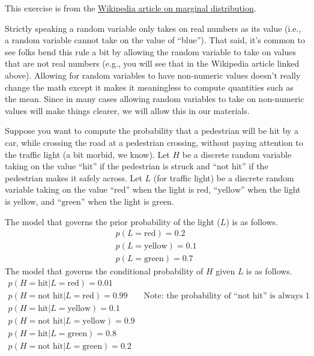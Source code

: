 \documentclass[assignment02_Solutions]{subfiles}
\begin{document}
\begin{exercise}[(15 minutes)]
This exercise is from the \href{https://en.wikipedia.org/wiki/Marginal_distribution\#Real-world_example}{Wikipedia article on marginal distribution}.

\vspace{1em}

\begin{notice}
Strictly speaking a random variable only takes on real numbers as its value (i.e., a random variable cannot take on the value of ``blue'').  That said, it's common to see folks bend this rule a bit by allowing the random variable to take on values that are not real numbers (e.g., you will see that in the Wikipedia article linked above).  Allowing for random variables to have non-numeric values doesn't really change the math except it makes it meaningless to compute quantities such as the mean.  Since in many cases allowing random variables to take on non-numeric values will make things clearer, we will allow this in our materials.
\end{notice} 
\vspace{1em}

Suppose you want to compute the probability that a pedestrian will be hit by a car, while crossing the road at a pedestrian crossing, without paying attention to the traffic light (a bit morbid, we know).  Let $H$ be a discrete random variable taking on the value ``$\mbox{hit}$'' if the pedestrian is struck and ``$\mbox{not hit}$'' if the pedestrian makes it safely across.  Let $L$ (for traffic light) be a discrete random variable taking on the value ``$\mbox{red}$'' when the light is red, ``$\mbox{yellow}$'' when the light is yellow, and ``$\mbox{green}$'' when the light is green.

The model that governs the prior probability of the light ($L$) is as follows.
\begin{align}
p(L = \mbox{red}) = 0.2 \nonumber \\
p(L = \mbox{yellow}) = 0.1 \nonumber \\
p(L = \mbox{green}) = 0.7
\end{align}
The model that governs the conditional probability of $H$ given $L$ is as follows.
\begin{align}
p(H = \mbox{hit} | L = \mbox{red}) = 0.01 \nonumber \\
p(H = \mbox{not hit} | L = \mbox{red}) = 0.99 &~~~~\mbox{Note: the probability of ``not hit'' is always 1 - probability of hit} \nonumber \\
p(H = \mbox{hit} | L = \mbox{yellow}) = 0.1 \nonumber \\
p(H = \mbox{not hit} | L = \mbox{yellow}) = 0.9 \nonumber \\
p(H = \mbox{hit} | L = \mbox{green}) = 0.8  \nonumber \\
p(H = \mbox{not hit} | L = \mbox{green}) = 0.2 \nonumber
\end{align}


\end{exercise}
\end{document}
